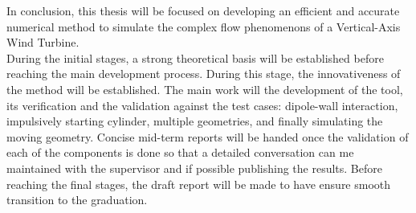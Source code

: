 In conclusion, this thesis will be focused on developing an efficient and accurate numerical method to simulate the complex flow phenomenons of a Vertical-Axis Wind Turbine.\\

During the initial stages, a strong theoretical basis will be established before reaching the main development process. During this stage, the innovativeness of the method will be established. The main work will the development of the tool, its verification and the validation against the test cases: dipole-wall interaction, impulsively starting cylinder, multiple geometries, and finally simulating the moving geometry. Concise mid-term reports will be handed once the validation of each of the components is done so that a detailed conversation can me maintained with the supervisor and if possible publishing the results. Before reaching the final stages, the draft report will be made to have ensure smooth transition to the graduation.\\

%
%
%



%